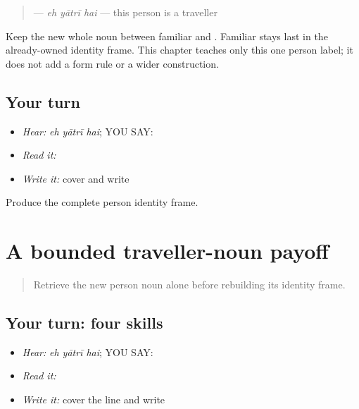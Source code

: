 \begin{grammarlens}[title={Grammar Lens}]
\begin{quote}
\textbf{  } — \emph{eh yātrī hai} — this person is a traveller
\end{quote}

Keep the new whole noun between familiar \textbf{} and \textbf{}. Familiar \textbf{} stays last in the already-owned identity frame. This chapter teaches only this one person label; it does not add a form rule or a wider construction.
\end{grammarlens}

\subsection*{Your turn}
\begin{itemize}
\raggedright
  \item \emph{Hear:} \emph{eh yātrī hai}; YOU SAY: \textbf{  }
  \item \emph{Read it:} \textbf{  }
  \item \emph{Write it:} cover and write \textbf{  }
\end{itemize}

\begin{tcolorbox}[breakable,colback=teal!4,colframe=teal!35!black,title={Before you move on}]
Produce the complete person identity frame.
\end{tcolorbox}
\section[\texorpdfstring{\pa{ਇਹ} \pa{ਯਾਤਰੀ} \pa{ਹੈ} (eh yaatrii hai)}{ਇਹ ਯਾਤਰੀ ਹੈ (eh yaatrii hai)}]{A bounded traveller-noun payoff}

\label{lesson:PA-C202-payoff}



\begin{quote}
Retrieve the new person noun alone before rebuilding its identity frame.
\end{quote}

\subsection*{Your turn: four skills}
\begin{itemize}
\raggedright
  \item \emph{Hear:} \emph{eh yātrī hai}; YOU SAY: \textbf{  }
  \item \emph{Read it:} \textbf{  }
  \item \emph{Write it:} cover the line and write \textbf{  }
\end{itemize}

